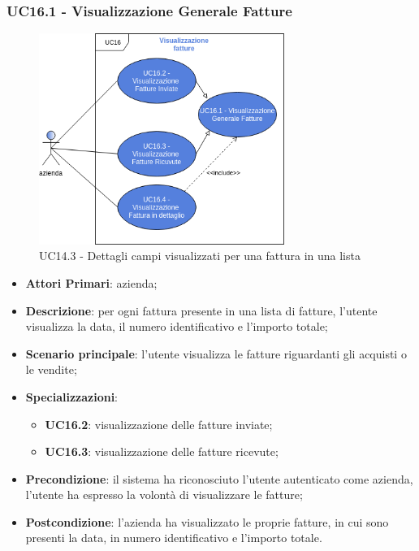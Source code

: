 \subsubsection{UC16.1 - Visualizzazione Generale Fatture}
\begin{figure}[h]
	\includegraphics[width=8cm]{res/images/UC16-Generale.png}
	\centering
	\caption{UC14.3 - Dettagli campi visualizzati per una fattura in una lista}
\end{figure}
\begin{itemize}
	\item \textbf{Attori Primari}: azienda;
	\item \textbf{Descrizione}: per ogni fattura presente in una lista di fatture, l'utente visualizza la data, il numero identificativo e l'importo totale; 
	\item \textbf{Scenario principale}: l'utente visualizza le fatture riguardanti gli acquisti o le vendite;
	\item \textbf{Specializzazioni}:
	\begin{itemize}
		\item \textbf{UC16.2}: visualizzazione delle fatture inviate; 
		\item \textbf{UC16.3}: visualizzazione delle fatture ricevute;
	\end{itemize}
	\item \textbf{Precondizione}: il sistema ha riconosciuto l'utente autenticato come azienda, l'utente ha espresso la volontà di visualizzare le fatture;
	\item \textbf{Postcondizione}: l'azienda ha visualizzato le proprie fatture, in cui sono presenti la data, in numero identificativo e l'importo totale.
\end{itemize} 
